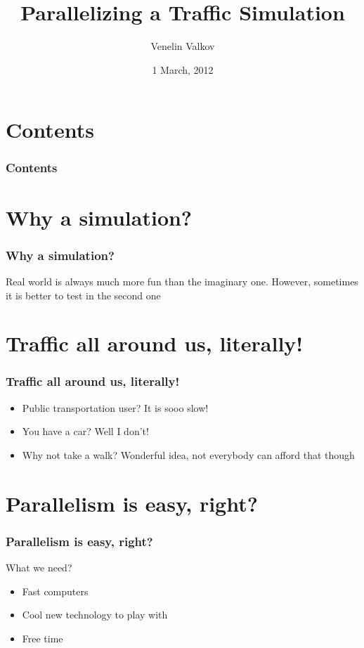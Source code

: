 \documentclass{beamer}
\title{Parallelizing a Traffic Simulation}
\author{Venelin Valkov}
\institute[University of Plovdiv]{Faculty of Mathematics and Informatics\\University of Plovdiv}
\date{1 March, 2012}
\begin{document}
  \frame
  {
    \titlepage
  }

  \section*{Contents}

  \frame
  {
    \frametitle{Contents}

    \tableofcontents
  }

  \section{Why a simulation?}

  \frame
  {
    \frametitle{Why a simulation?}

    Real world is always much more fun than the imaginary one. However, sometimes it is better to test in the second one
  }
  
  \section{Traffic all around us, literally!}
  \frame
  {
  	\frametitle{Traffic all around us, literally!}
  	\begin{itemize}
  		\item Public transportation user? It is sooo slow!
  		\item You have a car? Well I don't!
  		\item Why not take a walk? Wonderful idea, not everybody can afford that though
	\end{itemize}
}
  \section{Parallelism is easy, right?}
  \frame
  {
  	\frametitle{Parallelism is easy, right?}
  	What we need?
  	\begin{itemize}
  		\item Fast computers
  		\item Cool new technology to play with
  		\item Free time
	\end{itemize}  	
  }  
  
\end{document}
